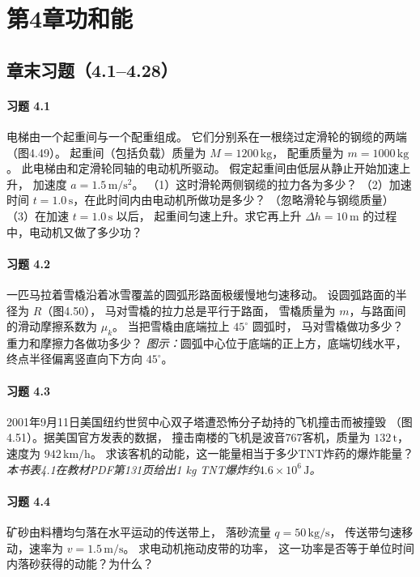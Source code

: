 \section*{第4章\quad 功和能}
\subsection*{章末习题（4.1--4.28）}

\paragraph{习题 4.1}
电梯由一个起重间与一个配重组成。
它们分别系在一根绕过定滑轮的钢缆的两端（图4.49）。
起重间（包括负载）质量为 \(M=1200\,\mathrm{kg}\)，
配重质量为 \(m=1000\,\mathrm{kg}\)。
此电梯由和定滑轮同轴的电动机所驱动。
假定起重间由低层从静止开始加速上升，
加速度 \(a=1.5\,\mathrm{m/s^2}\)。
（1）这时滑轮两侧钢缆的拉力各为多少？
（2）加速时间 \(t=1.0\,\mathrm s\)，在此时间内由电动机所做功是多少？
（忽略滑轮与钢缆质量）
（3）在加速 \(t=1.0\,\mathrm s\) 以后，
起重间匀速上升。求它再上升 \(\Delta h=10\,\mathrm m\)
的过程中，电动机又做了多少功？

\paragraph{习题 4.2}
一匹马拉着雪橇沿着冰雪覆盖的圆弧形路面极缓慢地匀速移动。
设圆弧路面的半径为 \(R\)（图4.50），
马对雪橇的拉力总是平行于路面，
雪橇质量为 \(m\)，与路面间的滑动摩擦系数为 \(\mu_k\)。
当把雪橇由底端拉上 \(45^\circ\) 圆弧时，
马对雪橇做功多少？重力和摩擦力各做功多少？
\textit{图示：}圆弧中心位于底端的正上方，底端切线水平，
终点半径偏离竖直向下方向 \(45^\circ\)。

\paragraph{习题 4.3}
2001年9月11日美国纽约世贸中心双子塔遭恐怖分子劫持的飞机撞击而被撞毁
（图4.51）。据美国官方发表的数据，
撞击南楼的飞机是波音767客机，质量为 \(132\,\mathrm t\)，
速度为 \(942\,\mathrm{km/h}\)。
求该客机的动能，这一能量相当于多少TNT炸药的爆炸能量？
\textit{本书表4.1在教材PDF第131页给出1 kg TNT爆炸约\(4.6\times10^6\,\mathrm J\)。}

\paragraph{习题 4.4}
矿砂由料槽均匀落在水平运动的传送带上，
落砂流量 \(q=50\,\mathrm{kg/s}\)，
传送带匀速移动，速率为 \(v=1.5\,\mathrm{m/s}\)。
求电动机拖动皮带的功率，
这一功率是否等于单位时间内落砂获得的动能？为什么？

